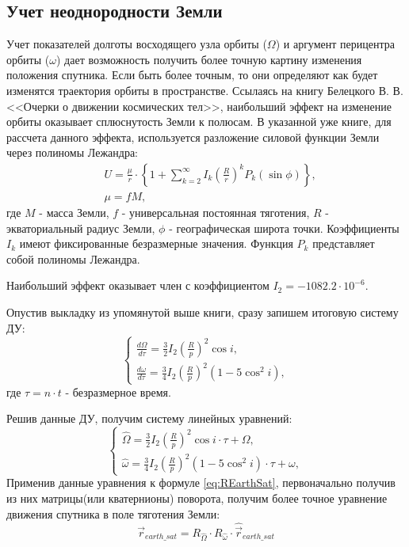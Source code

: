 \documentclass[tikz, a4paper,12pt]{extreport}
\begin{document}
  \subsection{Учет неоднородности Земли}
  \noindent\indent Учет показателей долготы восходящего узла орбиты ($\Omega$) и аргумент перицентра
  орбиты ($\omega$) дает возможность получить более точную картину изменения положения спутника.
  Если быть более точным, то они определяют как будет изменятся траектория орбиты в пространстве.
  Ссылаясь на книгу Белецкого В. В. <<Очерки о движении космических тел>>, наибольший эффект
  на изменение орбиты оказывает сплюснутость Земли к полюсам. В указанной уже книге, для
  рассчета данного эффекта, используется разложение силовой функции Земли через полиномы Лежандра:
  \begin{equation}
    \begin{aligned}
      & U = \frac{\mu}{r} \cdot \left\{1 + \sum\limits_{k=2}^{\infty}I_k\left(\frac{R}{r}\right)^k P_k(\sin{\phi})\right\}, \\
      & \mu = f M,
    \end{aligned}
  \end{equation}
  где $M$ - масса Земли,
  $f$ - универсальная постоянная тяготения,
  $R$ - экваториальный радиус Земли,
  $\phi$ - географическая широта точки.
  Коэффициенты $I_k$ имеют фиксированные безразмерные значения.
  Функция $P_k$ представляет собой полиномы Лежандра.\par
  Наибольший эффект оказывает член с коэффициентом $I_2 = -1082.2 \cdot 10^{-6}$. \par
  Опустив выкладку из упомянутой выше книги, сразу запишем итоговую систему ДУ:
  \begin{equation}
      \begin{cases}
        \frac{d\Omega}{d\tau} = \frac{3}{2}I_2\left(\frac{R}{p}\right)^2 \cos{i}, \\
        \frac{d\omega}{d\tau} = \frac{3}{4}I_2\left(\frac{R}{p}\right)^2(1 - 5\cos^2{i}),
      \end{cases}
  \end{equation}
  где $\tau = n \cdot t$ - безразмерное время.\par
  Решив данные ДУ, получим систему линейных уравнений:
  \begin{equation}
      \begin{cases}
        \hat{\Omega} = \frac{3}{2}I_2\left(\frac{R}{p}\right)^2 \cos{i} \cdot \tau + \Omega, \\
        \hat{\omega} = \frac{3}{4}I_2\left(\frac{R}{p}\right)^2(1 - 5\cos^2{i}) \cdot \tau + \omega,
      \end{cases}
  \end{equation}
  Применив данные уравнения к формуле \ref{eq:REarthSat}, первоначально получив
  из них матрицы(или кватернионы) поворота, получим более точное уравнение движения спутника в поле тяготения Земли:
  \begin{equation}
    \vec{r}_{earth\_sat} = R_{\hat{\Omega}} \cdot R_{\hat{\omega}} \cdot \hat{\vec{r}}_{earth\_sat}
  \end{equation}
\end{document}
